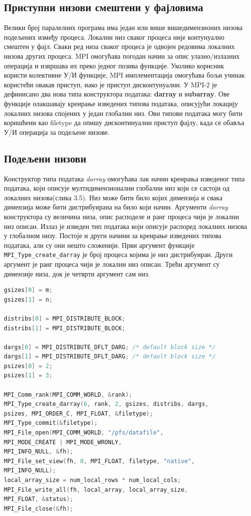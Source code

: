 \subsection{Приступни низови  смештени у фајловима}
Велики број паралелних програма има један или више вишедимензионих низова подељених између процеса. Локални низ сваког процеса није контунуално смештен у фајл. Сваки ред низа сваког процеса
је одвојен редовима локалних низова других процеса. MPI омогућава погодан начин за опис улазно/излазних операција и извршава их преко једног позива функције. Уколико корисник користи колективне У/И функције, MPI имплементација омогућава бољи учинак користећи овакав приступ, иако је приступ дисконтунуални. У MPI-2 је дефинисано два нова типа конструктора података: \textbf{darray} и \textbf{subarray}. Ове функције  олакшавају креирање изведених типова података, описујући локацију локалних низова спојених у један глобални низ. Ови типови података могу бити коришћени као filetype да опишу дисконтинуални приступ фајлу, када се обавља У/И операција за подељене низове.

\subsection{Подељени низови}
Конструктор типа података \textit{darray} омогућава лак начин креирања изведеног типа података, који описује мултидимензионални глобални низ који се састоји од локалних низова(слика 3.5). Низ може бити било којих димензија и свака димензија може бити дистрибуирана на било који начин. Аргументи \textit{darray} конструктора су величина низа, опис расподеле  и ранг процеса чији је локални низ описан. Излаз је изведен тип података који описује распоред локалних низова у глобалном низу. Постоје и други начини за креирање изведених типова података, али су они нешто сложенији.
Први аргумент функције \texttt{MPI\_Type\_create\_darray} је број процеса којима је низ дистрибуиран. Други аргумент је ранг процеса чији је локални низ описан. Трећи аргумент су димензије низа, док је четврти аргумент сам низ.

\begin{lstlisting}[style=nonumbers,frame=single,language=C, caption= Део MPI програма са подељеним низовима]
gsizes[0] = m;
gsizes[1] = n;

distribs[0] = MPI_DISTRIBUTE_BLOCK;
distribs[1] = MPI_DISTRIBUTE_BLOCK;

dargs[0] = MPI_DISTRIBUTE_DFLT_DARG; /* default block size */
dargs[1] = MPI_DISTRIBUTE_DFLT_DARG; /* default block size */
psizes[0] = 2;
psizes[1] = 3;

MPI_Comm_rank(MPI_COMM_WORLD, &rank);
MPI_Type_create_darray(6, rank, 2, gsizes, distribs, dargs,
psizes, MPI_ORDER_C, MPI_FLOAT, &filetype);
MPI_Type_commit(&filetype);
MPI_File_open(MPI_COMM_WORLD, "/pfs/datafile",
MPI_MODE_CREATE | MPI_MODE_WRONLY,
MPI_INFO_NULL, &fh);
MPI_File_set_view(fh, 0, MPI_FLOAT, filetype, "native",
MPI_INFO_NULL);
local_array_size = num_local_rows * num_local_cols;
MPI_File_write_all(fh, local_array, local_array_size,
MPI_FLOAT, &status);
MPI_File_close(&fh);
\end{lstlisting} 

